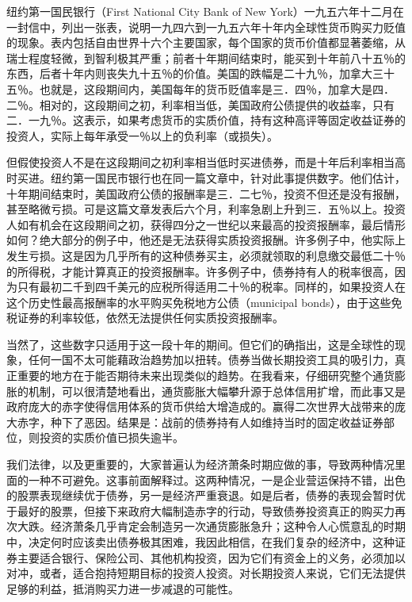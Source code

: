 \documentclass[UTF8,a4paper,zihao=-4,fontset = windows]{ctexart} %
\begin{document}
纽约第一国民银行（First National City Bank of New York）一九五六年十二月在一封信中，列出一张表，说明一九四六到一九五六年十年内全球性货币购买力贬值的现象。表内包括自由世界十六个主要国家，每个国家的货币价值都显著萎缩，从瑞士程度轻微，到智利极其严重；前者十年期间结束时，能买到十年前八十五％的东西，后者十年内则丧失九十五％的价值。美国的跌幅是二十九％，加拿大三十五％。也就是，这段期间内，美国每年的货币贬值率是三．四％，加拿大是四．二％。相对的，这段期间之初，利率相当低，美国政府公债提供的收益率，只有二．一九％。这表示，如果考虑货币的实质价值，持有这种高评等固定收益证券的投资人，实际上每年承受一％以上的负利率（或损失）。

但假使投资人不是在这段期间之初利率相当低时买进债券，而是十年后利率相当高时买进。纽约第一国民市银行也在同一篇文章中，针对此事提供数字。他们估计，十年期间结束时，美国政府公债的报酬率是三．二七％，投资不但还是没有报酬，甚至略微亏损。可是这篇文章发表后六个月，利率急剧上升到三．五％以上。投资人如有机会在这段期间之初，获得四分之一世纪以来最高的投资报酬率，最后情形如何？绝大部分的例子中，他还是无法获得实质投资报酬。许多例子中，他实际上发生亏损。这是因为几乎所有的这种债券买主，必须就领取的利息缴交最低二十％的所得税，才能计算真正的投资报酬率。许多例子中，债券持有人的税率很高，因为只有最初二千到四千美元的应税所得适用二十％的税率。同样的，如果投资人在这个历史性最高报酬率的水平购买免税地方公债（municipal bonds），由于这些免税证券的利率较低，依然无法提供任何实质投资报酬率。

当然了，这些数字只适用于这一段十年的期间。但它们的确指出，这是全球性的现象，任何一国不太可能藉政治趋势加以扭转。债券当做长期投资工具的吸引力，真正重要的地方在于能否期待未来出现类似的趋势。在我看来，仔细研究整个通货膨胀的机制，可以很清楚地看出，通货膨胀大幅攀升源于总体信用扩增，而此事又是政府庞大的赤字使得信用体系的货币供给大增造成的。赢得二次世界大战带来的庞大赤字，种下了恶因。结果是：战前的债券持有人如维持当时的固定收益证券部位，则投资的实质价值已损失逾半。

我们法律，以及更重要的，大家普遍认为经济萧条时期应做的事，导致两种情况里面的一种不可避免。这事前面解释过。这两种情况，一是企业营运保持不错，出色的股票表现继续优于债券，另一是经济严重衰退。如是后者，债券的表现会暂时优于最好的股票，但接下来政府大幅制造赤字的行动，导致债券投资真正的购买力再次大跌。经济萧条几乎肯定会制造另一次通货膨胀急升；这种令人心慌意乱的时期中，决定何时应该卖出债券极其困难，我因此相信，在我们复杂的经济中，这种证券主要适合银行、保险公司、其他机构投资，因为它们有资金上的义务，必须加以对冲，或者，适合抱持短期目标的投资人投资。对长期投资人来说，它们无法提供足够的利益，抵消购买力进一步减退的可能性。
\end{document}
